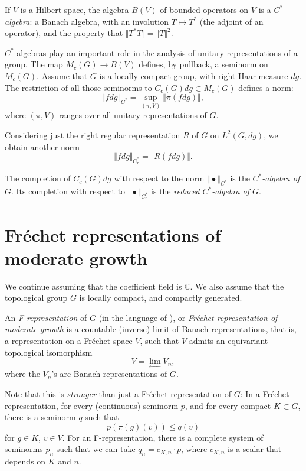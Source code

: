 If $V$ is a Hilbert space, the algebra $B(V)$ of bounded operators on $V$ is a {\it $C^*$-algebra}: a Banach algebra, with an involution $T\mapsto T^*$ (the adjoint of an operator), and the property that $\Vert T^*T\Vert = \Vert T\Vert^2$.

$C^*$-algebras play an important role in the analysis of unitary representations of a group. 
The map $M_c(G)\to B(V)$ defines, by pullback, a seminorm on $M_c(G)$. Assume that $G$ is a locally compact group, with right Haar measure $dg$. The restriction of all those seminorms to $C_c(G)dg\subset M_c(G)$ defines a norm:
$$ \Vert fdg \Vert_{C^*} = \sup_{(\pi,V)} \Vert \pi(fdg)\Vert,$$
where $(\pi,V)$ ranges over all unitary representations of $G$. 

Considering just the right regular representation $R$ of $G$ on $L^2(G,dg)$, we obtain another norm
$$ \Vert fdg \Vert_{C_r^*} = \Vert R(fdg)\Vert.$$

\begin{definition}
\label{definition-Cstar}
The completion of $C_c(G) dg$ with respect to the norm $\Vert\bullet\Vert_{C^*}$ is the {\it $C^*$-algebra of $G$}. Its completion with respect to $\Vert\bullet \Vert_{C_r^*}$ is the {\it reduced $C^*$-algebra of $G$}.
\end{definition}

\section{Fr\'echet representations of moderate growth}
\label{section-Frepresentations}

We continue assuming that the coefficient field is $\mathbb C$. We also assume that the topological group $G$ is locally compact, and compactly generated. 

\begin{definition}
\label{definition-Frepresentation}
An {\it F-representation} of $G$ (in the language of 
\cite{Bernstein-Kroetz}), or {\it Fr\'echet representation of moderate growth}
is a countable (inverse) limit of Banach representations, that is, a representation on a Fr\'echet space $V$, such that $V$ admits an equivariant topological isomorphism 
$$ 
V = \lim_{\leftarrow} V_n,
$$
where the $V_n$'s are Banach representations of $G$.
\end{definition}
 
Note that this is {\it stronger} than just a Fr\'echet representation of $G$: In a Fr\'echet representation, for every (continuous) seminorm $p$, and for every compact $K\subset G$, there is a seminorm $q$ such that 
$$ p(\pi(g) (v)) \le q(v)$$
for $g\in K$, $v\in V$. For an F-representation, there is a complete system of seminorms $p_n$ such that we can take $q_n=c_{K,n}\cdot p$, where $c_{K,n}$ is a scalar that depends on $K$ and $n$.


